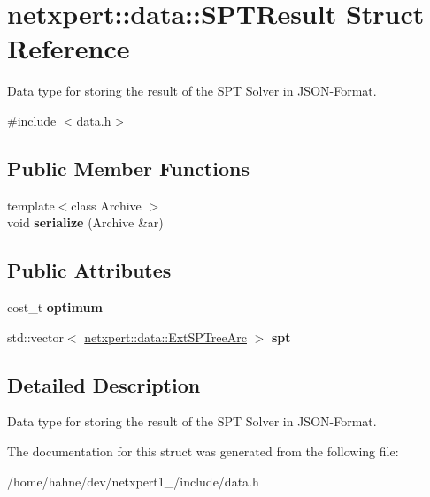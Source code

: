 \hypertarget{structnetxpert_1_1data_1_1SPTResult}{}\section{netxpert\+:\+:data\+:\+:S\+P\+T\+Result Struct Reference}
\label{structnetxpert_1_1data_1_1SPTResult}


Data type for storing the result of the S\+PT Solver in J\+S\+O\+N-\/\+Format.  




{\ttfamily \#include $<$data.\+h$>$}

\subsection*{Public Member Functions}
\begin{DoxyCompactItemize}
\item 
{\footnotesize template$<$class Archive $>$ }\\void {\bfseries serialize} (Archive \&ar)\hypertarget{structnetxpert_1_1data_1_1SPTResult_ac789313adfb3db98372f69d7e964a441}{}\label{structnetxpert_1_1data_1_1SPTResult_ac789313adfb3db98372f69d7e964a441}

\end{DoxyCompactItemize}
\subsection*{Public Attributes}
\begin{DoxyCompactItemize}
\item 
cost\+\_\+t {\bfseries optimum}\hypertarget{structnetxpert_1_1data_1_1SPTResult_a7474e0933e165b85736ae54482e91666}{}\label{structnetxpert_1_1data_1_1SPTResult_a7474e0933e165b85736ae54482e91666}

\item 
std\+::vector$<$ \hyperlink{structnetxpert_1_1data_1_1ExtSPTreeArc}{netxpert\+::data\+::\+Ext\+S\+P\+Tree\+Arc} $>$ {\bfseries spt}\hypertarget{structnetxpert_1_1data_1_1SPTResult_a7f5134ed3043eb8d93d8f2009bc58c2b}{}\label{structnetxpert_1_1data_1_1SPTResult_a7f5134ed3043eb8d93d8f2009bc58c2b}

\end{DoxyCompactItemize}


\subsection{Detailed Description}
Data type for storing the result of the S\+PT Solver in J\+S\+O\+N-\/\+Format. 

The documentation for this struct was generated from the following file\+:\begin{DoxyCompactItemize}
\item 
/home/hahne/dev/netxpert1\+\_/include/data.\+h\end{DoxyCompactItemize}
